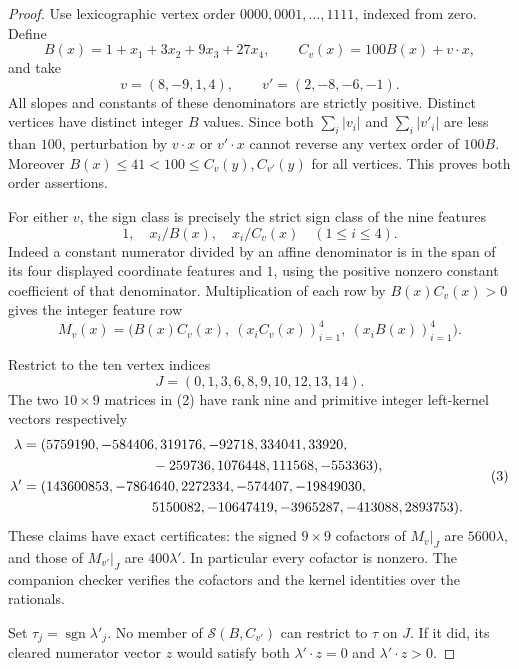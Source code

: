 \documentclass[11pt]{article}
\begin{document}
\begin{proof}
Use lexicographic vertex order $0000,0001,\ldots,1111$, indexed from
zero. Define
\[
 B(x)=1+x_1+3x_2+9x_3+27x_4,
 \qquad C_v(x)=100B(x)+v\cdot x,
\]
and take
\[
 v=(8,-9,1,4),\qquad v'=(2,-8,-6,-1).
\]
All slopes and constants of these denominators are strictly positive.
Distinct vertices have distinct integer $B$ values. Since both
$\sum_i|v_i|$ and $\sum_i|v'_i|$ are less than $100$, perturbation
by $v\cdot x$ or $v'\cdot x$ cannot reverse any vertex order of $100B$.
Moreover $B(x)\leq41<100\leq C_v(y),C_{v'}(y)$ for all vertices.
This proves both order assertions.

For either $v$, the sign class is precisely the strict sign class of
the nine features
\[
 1,\quad x_i/B(x),\quad x_i/C_v(x)\quad(1\leq i\leq4).
 \tag{1}
\]
Indeed a constant numerator divided by an affine denominator is in
the span of its four displayed coordinate features and $1$, using
the positive nonzero constant coefficient of that denominator.
Multiplication of each row by $B(x)C_v(x)>0$ gives the integer
feature row
\[
 M_v(x)=\bigl(B(x)C_v(x),\ (x_iC_v(x))_{i=1}^4,
                                  \ (x_iB(x))_{i=1}^4\bigr).
 \tag{2}
\]

Restrict to the ten vertex indices
\[
                 J=(0,1,3,6,8,9,10,12,13,14).
\]
The two $10\times9$ matrices in (2) have rank nine and primitive
integer left-kernel vectors respectively
\[
 \begin{split}
 \lambda={}&(5759190,-584406,319176,-92718,334041,33920,\\
             &\hspace{28mm}-259736,1076448,111568,-553363),\\
 \lambda'={}&(143600853,-7864640,2272334,-574407,-19849030,\\
             &\hspace{28mm}5150082,-10647419,-3965287,-413088,2893753).
 \end{split}
 \tag{3}
\]
These claims have exact certificates: the signed $9\times9$ cofactors
of $M_v|_J$ are $5600\lambda$, and those of $M_{v'}|_J$ are
$400\lambda'$. In particular every cofactor is nonzero. The companion
checker verifies the cofactors and the kernel identities over the
rationals.

Set $\tau_j=\operatorname{sgn}\lambda'_j$. No member of
$\mathcal S(B,C_{v'})$ can restrict to $\tau$ on $J$.
If it did, its cleared numerator vector $z$ would satisfy both
$\lambda'\cdot z=0$ and $\lambda'\cdot z>0$.


\end{proof}
\end{document}
